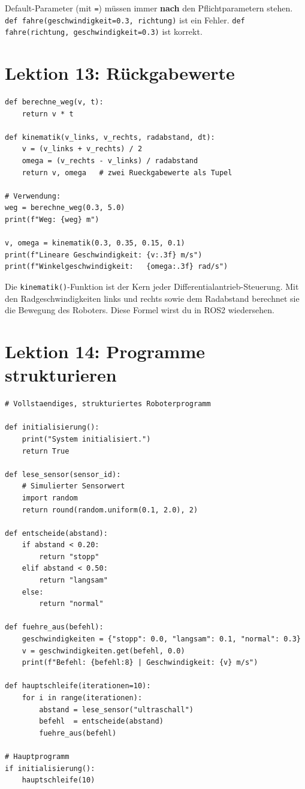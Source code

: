 \begin{merksatz}
Default-Parameter (mit \texttt{=}) müssen immer \textbf{nach} den Pflichtparametern stehen. \texttt{def fahre(geschwindigkeit=0.3, richtung)} ist ein Fehler. \texttt{def fahre(richtung, geschwindigkeit=0.3)} ist korrekt.
\end{merksatz}

\section{Lektion 13: Rückgabewerte}

\begin{lstlisting}
def berechne_weg(v, t):
    return v * t

def kinematik(v_links, v_rechts, radabstand, dt):
    v = (v_links + v_rechts) / 2
    omega = (v_rechts - v_links) / radabstand
    return v, omega   # zwei Rueckgabewerte als Tupel

# Verwendung:
weg = berechne_weg(0.3, 5.0)
print(f"Weg: {weg} m")

v, omega = kinematik(0.3, 0.35, 0.15, 0.1)
print(f"Lineare Geschwindigkeit: {v:.3f} m/s")
print(f"Winkelgeschwindigkeit:   {omega:.3f} rad/s")
\end{lstlisting}

\begin{praxis}
Die \texttt{kinematik()}-Funktion ist der Kern jeder Differentialantrieb-Steuerung. Mit den Radgeschwindigkeiten links und rechts sowie dem Radabstand berechnet sie die Bewegung des Roboters. Diese Formel wirst du in ROS2 wiedersehen.
\end{praxis}

\section{Lektion 14: Programme strukturieren}

\begin{lstlisting}
# Vollstaendiges, strukturiertes Roboterprogramm

def initialisierung():
    print("System initialisiert.")
    return True

def lese_sensor(sensor_id):
    # Simulierter Sensorwert
    import random
    return round(random.uniform(0.1, 2.0), 2)

def entscheide(abstand):
    if abstand < 0.20:
        return "stopp"
    elif abstand < 0.50:
        return "langsam"
    else:
        return "normal"

def fuehre_aus(befehl):
    geschwindigkeiten = {"stopp": 0.0, "langsam": 0.1, "normal": 0.3}
    v = geschwindigkeiten.get(befehl, 0.0)
    print(f"Befehl: {befehl:8} | Geschwindigkeit: {v} m/s")

def hauptschleife(iterationen=10):
    for i in range(iterationen):
        abstand = lese_sensor("ultraschall")
        befehl  = entscheide(abstand)
        fuehre_aus(befehl)

# Hauptprogramm
if initialisierung():
    hauptschleife(10)
\end{lstlisting}

